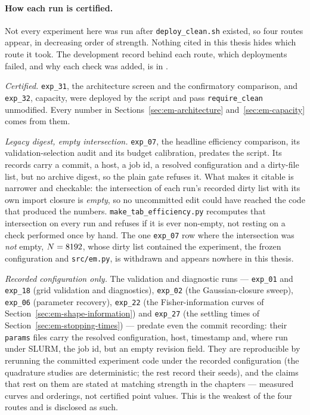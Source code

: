 \paragraph{How each run is certified.}\label{sec:repro-provenance}
Not every experiment here was run after
\texttt{deploy\_clean.sh} existed, so four routes appear, in decreasing
order of strength. Nothing cited in this thesis hides which route it took. The development record behind each
route, which deployments failed, and why each check was added, is in
\compendium{}.

\emph{Certified.} \texttt{exp\_31}, the architecture screen and the
confirmatory comparison, and \texttt{exp\_32}, capacity, were deployed by the
script and pass \texttt{require\_clean} unmodified. Every number in
Sections~\ref{sec:em-architecture} and~\ref{sec:em-capacity} comes from them.

\emph{Legacy digest, empty intersection.} \texttt{exp\_07}, the headline
efficiency comparison, its validation-selection audit and its budget
calibration, predates the script. Its records carry a commit, a host, a job
id, a resolved configuration and a dirty-file list, but no
archive digest, so the plain gate refuses it. What makes it citable is
narrower and checkable: the intersection of each run's recorded dirty list with
its own import closure is \emph{empty}, so no uncommitted edit could have
reached the code that produced the numbers.
\texttt{make\_tab\_efficiency.py} recomputes that intersection on every run
and refuses if it is ever non-empty, not resting on a check performed
once by hand. The one \texttt{exp\_07} row where the intersection was
\emph{not} empty, $N = 8192$, whose dirty list contained the
experiment, the frozen configuration and \texttt{src/em.py}, is withdrawn
and appears nowhere in this thesis.

\emph{Recorded configuration only.} The validation and diagnostic runs ---
\texttt{exp\_01} and \texttt{exp\_18} (grid validation and diagnostics),
\texttt{exp\_02} (the Gaussian-closure sweep), \texttt{exp\_06} (parameter
recovery), \texttt{exp\_22} (the Fisher-information curves of
Section~\ref{sec:em-shape-information}) and \texttt{exp\_27} (the settling
times of Section~\ref{sec:em-stopping-times}) --- predate even the commit
recording: their \texttt{params} files carry the resolved configuration,
host, timestamp and, where run under SLURM, the job id, but an empty revision
field. They are reproducible by rerunning the committed experiment code under
the recorded configuration (the quadrature studies are deterministic; the
rest record their seeds), and the claims that rest on them are stated at
matching strength in the chapters --- measured curves and orderings, not
certified point values. This is the weakest of the four routes and is
disclosed as such.

